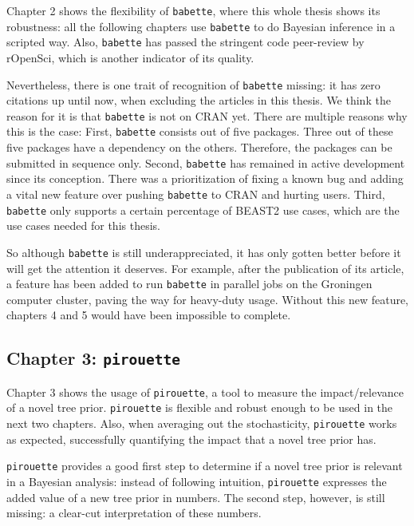 Chapter 2 shows the flexibility of \verb;babette;, where this whole thesis
shows its robustness: all the following chapters use \verb;babette; to
do Bayesian inference in a scripted way. Also, \verb;babette; has passed
the stringent code peer-review by rOpenSci, which is another indicator of 
its quality.

Nevertheless, there is one trait of recognition of \verb;babette; missing:
it has zero citations up until now, when excluding the articles in this 
thesis. We think the reason for it is that \verb;babette; is
not on CRAN yet. There are multiple reasons why this is the case:
First, \verb;babette; consists out of five packages. Three out of these
five packages have a dependency on the others. Therefore, the packages can
be submitted in sequence only. Second, \verb;babette; has remained in active 
development since its conception. There was a prioritization of 
fixing a known bug and adding a vital new feature over 
pushing \verb;babette; to CRAN and hurting users. Third, \verb;babette;
only supports a certain percentage of BEAST2 use cases, which are the
use cases needed for this thesis. 

So although \verb;babette; is still underappreciated, it has only gotten
better before it will get the attention it deserves. 
For example, after the publication of its article, 
a feature has been added to run \verb;babette; in parallel
jobs on the Groningen computer cluster, paving the way for heavy-duty 
usage. Without this new feature, chapters 4 and 5 would have been
impossible to complete.

\subsection{Chapter 3: \texttt{pirouette}}

Chapter 3 shows the usage of \verb;pirouette;, a tool to measure the
impact/relevance of a novel tree prior. \verb;pirouette; is flexible and
robust enough to be used in the next two chapters. Also, when averaging
out the stochasticity, \verb;pirouette; works as expected, successfully
quantifying the impact that a novel tree prior has.

\verb;pirouette; provides a good first step to determine 
if a novel tree prior is relevant in a Bayesian analysis:
instead of following intuition, \verb;pirouette; expresses 
the added value of a new tree prior in numbers. The second step,
however, is still missing: a clear-cut interpretation of these numbers.

